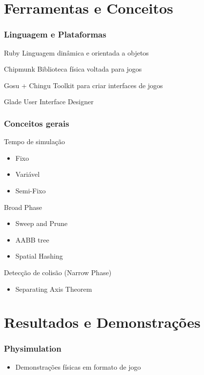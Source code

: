 \documentclass{beamer}
\begin{document}
\section{Ferramentas e Conceitos}
\begin{frame}
  \frametitle{Linguagem e Plataformas}
  \begin{block}{Ruby}
    Linguagem dinâmica e orientada a objetos
  \end{block}
  \begin{block}{Chipmunk}
    Biblioteca física voltada para jogos
  \end{block}
  \begin{block}{Gosu + Chingu}
    Toolkit para criar interfaces de jogos
  \end{block}
  \begin{block}{Glade}
    User Interface Designer
  \end{block}
\end{frame}
\begin{frame}
  \frametitle{Conceitos gerais}
  \begin{block}{Tempo de simulação}
    \begin{itemize}
      \item Fixo
      \item Variável
      \item Semi-Fixo
    \end{itemize}
  \end{block}
  \begin{block}{Broad Phase}
    \begin{itemize}
      \item Sweep and Prune
      \item AABB tree
      \item Spatial Hashing
    \end{itemize}
  \end{block}
  \begin{block}{Detecção de colisão (Narrow Phase)}
    \begin{itemize}
      \item Separating Axis Theorem
    \end{itemize}
  \end{block}
\end{frame}
\section{Resultados e Demonstrações} 

\begin{frame}
  \frametitle{Physimulation}
    \begin{itemize}
      \item Demonstrações físicas em formato de jogo
    \end{itemize} 
\end{frame}
\end{document}
